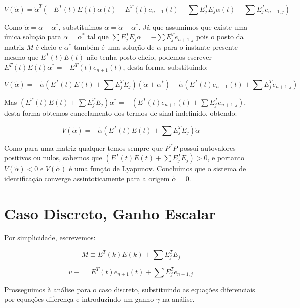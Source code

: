 \documentclass[11pt]{report}
\begin{document}
\begin{equation}
\dot{V}(\tilde{\alpha}) = \tilde{\alpha}^T(-E^T(t)E(t)\alpha(t) - E^T(t)e_{n+1}(t) -\sum E_j^TE_j\alpha(t) -\sum E_j^Te_{n+1,j})
\end{equation}

Como $\tilde{\alpha} = \alpha - \alpha^*$, substituímos $\alpha = \tilde{\alpha} + \alpha^*$. Já que assumimos que existe uma única solução para $\alpha=\alpha^*$ tal que $\sum E^T_jE_j \alpha = -\sum E^T_je_{n+1,j}$ pois o posto da matriz $M$ é cheio e $\alpha^*$ também é uma solução de $\alpha$ para o instante presente mesmo que $E^T(t)E(t)$ não tenha posto cheio, podemos escrever $E^T(t)E(t)\alpha^* = -E^T(t)e_{n+1}(t)$, desta forma, substituindo:

\begin{equation}
\dot{V}(\tilde{\alpha}) = -\tilde{\alpha}(E^T(t)E(t)+\sum E_j^TE_j)(\tilde{\alpha}+\alpha^*) - \tilde{\alpha}(E^T(t)e_{n+1}(t) + \sum E_j^Te_{n+1,j})
\end{equation}

Mas $(E^T(t)E(t)+\sum E_j^TE_j)\alpha^* = -(E^T(t)e_{n+1}(t) + \sum E_j^Te_{n+1,j})$, desta forma obtemos cancelamento dos termos de sinal indefinido, obtendo:

\begin{equation}
\dot{V}(\tilde{\alpha}) = -\tilde{\alpha}(E^T(t)E(t)+\sum E_j^TE_j)\tilde{\alpha}
\end{equation}

Como para uma matriz qualquer temos sempre que $P^TP$ possui autovalores positivos ou nulos, sabemos que $(E^T(t)E(t)+\sum E_j^TE_j)>0$, e portanto $\dot{V}(\tilde{\alpha})<0$ e $V(\tilde{\alpha})$ é uma função de Lyapunov. Concluímos que o sistema de identificação converge assintoticamente para a origem $\tilde{\alpha} = 0$.

\section{Caso Discreto, Ganho Escalar}

Por simplicidade, escrevemos:

\begin{equation}
M\equiv E^T(k) E(k)+\sum E_j^TE_j
\end{equation}

\begin{equation}
v\equiv = E^T(t)e_{n+1}(t) + \sum E_j^Te_{n+1,j}
\end{equation}

Prosseguimos à análise para o caso discreto, substituindo as equações diferenciais por equações diferença e introduzindo um ganho $\gamma$ na análise. 
\end{document}
